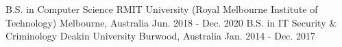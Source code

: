 
\vspace*{-0.7cm}
\begin{cventries}
  \cventry
    {B.S. in Computer Science}
    {RMIT University (Royal Melbourne Institute of Technology)}
    {Melbourne, Australia}
    {Jun. 2018 - Dec. 2020}
\vspace*{-1cm}
  \cventry
    {B.S. in IT Security \& Criminology}
    {Deakin University}
    {Burwood, Australia}
    {Jan. 2014 - Dec. 2017}
\end{cventries}
